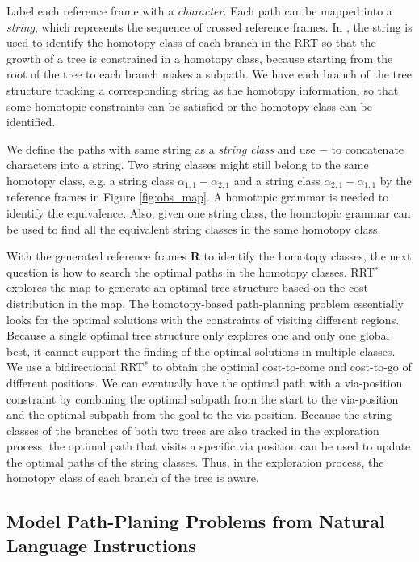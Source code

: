 \documentclass[phd]{byuprop}
\begin{document}
Label each reference frame with a \emph{character}.
Each path can be mapped into a {\em string}, which represents the sequence of crossed reference frames.
In \cite{Hernandez2015}, the string is used to identify the homotopy class of each branch in the RRT so that the growth of a tree is constrained in a homotopy class, because starting from the root of the tree to each branch makes a subpath.
We have each branch of the tree structure tracking a corresponding string as the homotopy information, so that some homotopic constraints can be satisfied or the homotopy class can be identified.

We define the paths with same string as a \emph{string class} and use $ - $ to concatenate characters into a string.
Two string classes might still belong to the same homotopy class, e.g. a string class $ \alpha_{1,1}-\alpha_{2,1} $ and a string class $ \alpha_{2,1}-\alpha_{1,1} $ by the reference frames in Figure \ref{fig:obs_map}.
A homotopic grammar is needed to identify the equivalence.
Also, given one string class, the homotopic grammar can be used to find all the equivalent string classes in the same homotopy class.

With the generated reference frames $ \mathbf{R} $ to identify the homotopy classes, the next question is how to search the optimal paths in the homotopy classes.
RRT$^{*}$ explores the map to generate an optimal tree structure based on the cost distribution in the map.
The homotopy-based path-planning problem essentially looks for the optimal solutions with the constraints of visiting different regions.
Because a single optimal tree structure only explores one and only one global best, it cannot support the finding of the optimal solutions in multiple classes.
We use a bidirectional RRT$^{*}$ to obtain the optimal cost-to-come and cost-to-go of different positions.
We can eventually have the optimal path with a via-position constraint by combining the optimal subpath from the start to the via-position and the optimal subpath from the goal to the via-position.
Because the string classes of the branches of both two trees are also tracked in the exploration process, the optimal path that visits a specific via position can be used to update the optimal paths of the string classes. 
Thus, in the exploration process, the homotopy class of each branch of the tree is aware.

\subsection{Model Path-Planing Problems from Natural Language Instructions}
\label{sec:project_description:path_planning_with_natural_language_instruction}
\end{document}
